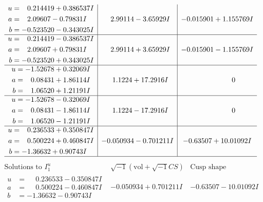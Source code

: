 \documentclass[1p]{elsarticle_modified}
\theoremstyle{definition}
\newcommand{\I}{\sqrt{-1}}
\begin{document}
$$\begin{array}{c|c|c}
\begin{aligned}
u &= \phantom{-}0.214419 + 0.386537 I \\
a &= \phantom{-}2.09607 - 0.79831 I \\
b &= -0.523520 - 0.343025 I\end{aligned}
 & \phantom{-}2.99114 - 3.65929 I & -0.015901 + 1.155769 I \\ \hline\begin{aligned}
u &= \phantom{-}0.214419 - 0.386537 I \\
a &= \phantom{-}2.09607 + 0.79831 I \\
b &= -0.523520 + 0.343025 I\end{aligned}
 & \phantom{-}2.99114 + 3.65929 I & -0.015901 - 1.155769 I \\ \hline\begin{aligned}
u &= -1.52678 + 0.32069 I \\
a &= \phantom{-}0.08431 + 1.86114 I \\
b &= \phantom{-}1.06520 + 1.21191 I\end{aligned}
 & \phantom{-}1.1224 + 17.2916 I & \phantom{-0.000000 } 0 \\ \hline\begin{aligned}
u &= -1.52678 - 0.32069 I \\
a &= \phantom{-}0.08431 - 1.86114 I \\
b &= \phantom{-}1.06520 - 1.21191 I\end{aligned}
 & \phantom{-}1.1224 - 17.2916 I & \phantom{-0.000000 } 0 \\ \hline\begin{aligned}
u &= \phantom{-}0.236533 + 0.350847 I \\
a &= \phantom{-}0.500224 + 0.460847 I \\
b &= -1.36632 + 0.90743 I\end{aligned}
 & -0.050934 - 0.701211 I & -0.63507 + 10.01092 I\\
 \hline 
 \end{array}$$\newpage$$\begin{array}{c|c|c}  
\text{Solutions to }I^u_{1}& \I (\text{vol} + \sqrt{-1}CS) & \text{Cusp shape}\\
 \hline 
\begin{aligned}
u &= \phantom{-}0.236533 - 0.350847 I \\
a &= \phantom{-}0.500224 - 0.460847 I \\
b &= -1.36632 - 0.90743 I\end{aligned}
 & -0.050934 + 0.701211 I & -0.63507 - 10.01092 I \\ \hline\begin{aligned}

\end{aligned}
\end{array}$$
\end{document}
